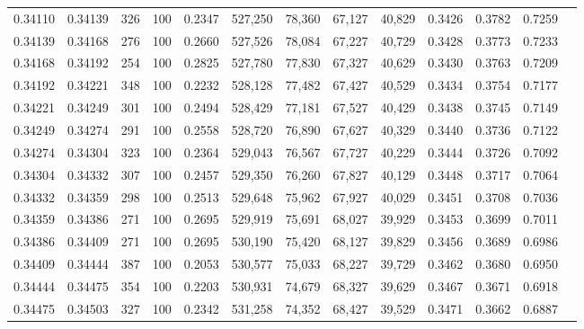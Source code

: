 \begin{tabular}{rrrrrrrrrrrrr}
0.34110 & 0.34139 &   326 & 100 &                                     0.2347 & 527,250 &  78,360 &  67,127 &  40,829 & 0.3426 & 0.3782 & 0.7259 \\
0.34139 & 0.34168 &   276 & 100 &                                     0.2660 & 527,526 &  78,084 &  67,227 &  40,729 & 0.3428 & 0.3773 & 0.7233 \\
0.34168 & 0.34192 &   254 & 100 &                                     0.2825 & 527,780 &  77,830 &  67,327 &  40,629 & 0.3430 & 0.3763 & 0.7209 \\
0.34192 & 0.34221 &   348 & 100 &                                     0.2232 & 528,128 &  77,482 &  67,427 &  40,529 & 0.3434 & 0.3754 & 0.7177 \\
0.34221 & 0.34249 &   301 & 100 &                                     0.2494 & 528,429 &  77,181 &  67,527 &  40,429 & 0.3438 & 0.3745 & 0.7149 \\
0.34249 & 0.34274 &   291 & 100 &                                     0.2558 & 528,720 &  76,890 &  67,627 &  40,329 & 0.3440 & 0.3736 & 0.7122 \\
0.34274 & 0.34304 &   323 & 100 &                                     0.2364 & 529,043 &  76,567 &  67,727 &  40,229 & 0.3444 & 0.3726 & 0.7092 \\
0.34304 & 0.34332 &   307 & 100 &                                     0.2457 & 529,350 &  76,260 &  67,827 &  40,129 & 0.3448 & 0.3717 & 0.7064 \\
0.34332 & 0.34359 &   298 & 100 &                                     0.2513 & 529,648 &  75,962 &  67,927 &  40,029 & 0.3451 & 0.3708 & 0.7036 \\
0.34359 & 0.34386 &   271 & 100 &                                     0.2695 & 529,919 &  75,691 &  68,027 &  39,929 & 0.3453 & 0.3699 & 0.7011 \\
0.34386 & 0.34409 &   271 & 100 &                                     0.2695 & 530,190 &  75,420 &  68,127 &  39,829 & 0.3456 & 0.3689 & 0.6986 \\
0.34409 & 0.34444 &   387 & 100 &                                     0.2053 & 530,577 &  75,033 &  68,227 &  39,729 & 0.3462 & 0.3680 & 0.6950 \\
0.34444 & 0.34475 &   354 & 100 &                                     0.2203 & 530,931 &  74,679 &  68,327 &  39,629 & 0.3467 & 0.3671 & 0.6918 \\
0.34475 & 0.34503 &   327 & 100 &                                     0.2342 & 531,258 &  74,352 &  68,427 &  39,529 & 0.3471 & 0.3662 & 0.6887 \\

\end{tabular}
